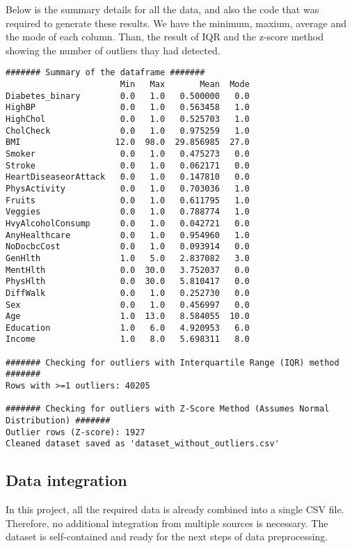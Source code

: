 \noindent Below is the summary details for all the data, and also the code that was required to generate these results. We have the minimum, maxium, average and the mode of each column. Than, the result of IQR and the z-score method showing the number of outliers thay had detected.



\begin{lstlisting}
####### Summary of the dataframe #######
                       Min   Max       Mean  Mode
Diabetes_binary        0.0   1.0   0.500000   0.0
HighBP                 0.0   1.0   0.563458   1.0
HighChol               0.0   1.0   0.525703   1.0
CholCheck              0.0   1.0   0.975259   1.0
BMI                   12.0  98.0  29.856985  27.0
Smoker                 0.0   1.0   0.475273   0.0
Stroke                 0.0   1.0   0.062171   0.0
HeartDiseaseorAttack   0.0   1.0   0.147810   0.0
PhysActivity           0.0   1.0   0.703036   1.0
Fruits                 0.0   1.0   0.611795   1.0
Veggies                0.0   1.0   0.788774   1.0
HvyAlcoholConsump      0.0   1.0   0.042721   0.0
AnyHealthcare          0.0   1.0   0.954960   1.0
NoDocbcCost            0.0   1.0   0.093914   0.0
GenHlth                1.0   5.0   2.837082   3.0
MentHlth               0.0  30.0   3.752037   0.0
PhysHlth               0.0  30.0   5.810417   0.0
DiffWalk               0.0   1.0   0.252730   0.0
Sex                    0.0   1.0   0.456997   0.0
Age                    1.0  13.0   8.584055  10.0
Education              1.0   6.0   4.920953   6.0
Income                 1.0   8.0   5.698311   8.0

####### Checking for outliers with Interquartile Range (IQR) method #######
Rows with >=1 outliers: 40205

####### Checking for outliers with Z-Score Method (Assumes Normal Distribution) #######
Outlier rows (Z-score): 1927
Cleaned dataset saved as 'dataset_without_outliers.csv'
\end{lstlisting}

\subsection{Data integration}
In this project, all the required data is already combined into a single CSV file. Therefore, no additional integration from multiple sources is necessary. The dataset is self-contained and ready for the next steps of data preprocessing.

